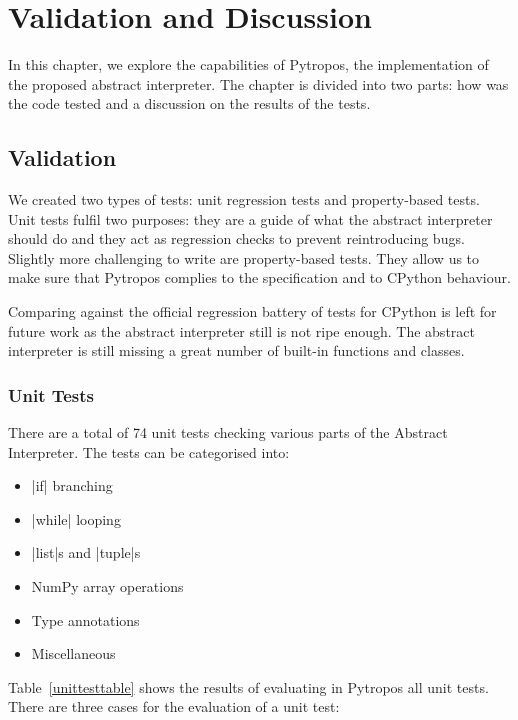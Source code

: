 \chapter{Validation and Discussion}\label{validation-and-discussion}

In this chapter, we explore the capabilities of Pytropos, the implementation of the
proposed abstract interpreter. The chapter is divided into two parts: how was the code
tested and a discussion on the results of the tests.

\section{Validation}\label{validation}

We created two types of tests: unit regression tests and property-based tests. Unit tests
fulfil two purposes: they are a guide of what the abstract interpreter should do and they
act as regression checks to prevent reintroducing bugs. Slightly more challenging to
write are property-based tests. They allow us to make sure that Pytropos complies to the
specification and to CPython behaviour.

Comparing against the official regression battery of tests for CPython is left for future
work as the abstract interpreter still is not ripe enough. The abstract interpreter is
still missing a great number of built-in functions and classes.

\subsection{Unit Tests}\label{unit-tests}

There are a total of 74 unit tests checking various parts of the Abstract Interpreter. The
tests can be categorised into:

\begin{itemize}
\tightlist
\item \pycode|if| branching
\item \pycode|while| looping
\item \pycode|list|s and \pycode|tuple|s
\item NumPy array operations
\item Type annotations
\item Miscellaneous
\end{itemize}

Table~\ref{unittesttable} shows the results of evaluating in Pytropos all unit tests.
There are three cases for the evaluation of a unit test:

